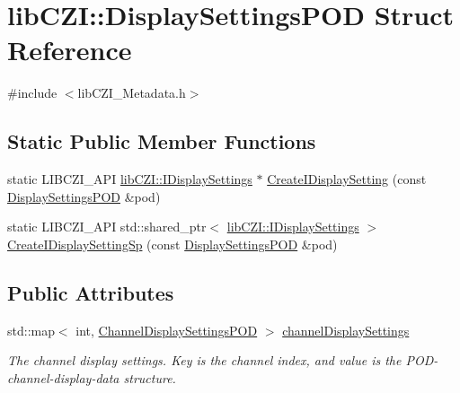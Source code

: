 \hypertarget{structlib_c_z_i_1_1_display_settings_p_o_d}{}\section{lib\+C\+ZI\+:\+:Display\+Settings\+P\+OD Struct Reference}
\label{structlib_c_z_i_1_1_display_settings_p_o_d}


{\ttfamily \#include $<$lib\+C\+Z\+I\+\_\+\+Metadata.\+h$>$}

\subsection*{Static Public Member Functions}
\begin{DoxyCompactItemize}
\item 
static L\+I\+B\+C\+Z\+I\+\_\+\+A\+PI \hyperlink{classlib_c_z_i_1_1_i_display_settings}{lib\+C\+Z\+I\+::\+I\+Display\+Settings} $\ast$ \hyperlink{structlib_c_z_i_1_1_display_settings_p_o_d_acc98054af6df033b27b5c8214cb90284}{Create\+I\+Display\+Setting} (const \hyperlink{structlib_c_z_i_1_1_display_settings_p_o_d}{Display\+Settings\+P\+OD} \&pod)
\item 
static L\+I\+B\+C\+Z\+I\+\_\+\+A\+PI std\+::shared\+\_\+ptr$<$ \hyperlink{classlib_c_z_i_1_1_i_display_settings}{lib\+C\+Z\+I\+::\+I\+Display\+Settings} $>$ \hyperlink{structlib_c_z_i_1_1_display_settings_p_o_d_afed6c69c9ffc6092c7d34706428767fa}{Create\+I\+Display\+Setting\+Sp} (const \hyperlink{structlib_c_z_i_1_1_display_settings_p_o_d}{Display\+Settings\+P\+OD} \&pod)
\end{DoxyCompactItemize}
\subsection*{Public Attributes}
\begin{DoxyCompactItemize}
\item 
\mbox{\label{structlib_c_z_i_1_1_display_settings_p_o_d_a6b8e45609b0d032340e5445f99fe9c59}} 
std\+::map$<$ int, \hyperlink{structlib_c_z_i_1_1_channel_display_settings_p_o_d}{Channel\+Display\+Settings\+P\+OD} $>$ \hyperlink{structlib_c_z_i_1_1_display_settings_p_o_d_a6b8e45609b0d032340e5445f99fe9c59}{channel\+Display\+Settings}
\begin{DoxyCompactList}\small\item\em The channel display settings. Key is the channel index, and value is the P\+O\+D-\/channel-\/display-\/data structure. \end{DoxyCompactList}\end{DoxyCompactItemize}


